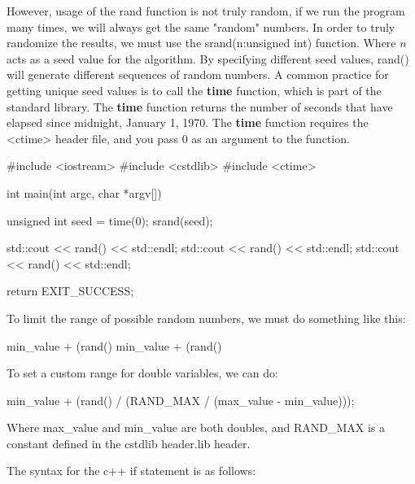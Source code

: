 \documentclass{report}
\begin{document}
    \bigbreak \noindent 
    However, usage of the rand function is not truly random, if we run the program many times, we will always get the same "random" numbers. In order to truly randomize the results, we must use the srand(n:unsigned int) function. Where $n$ acts as a seed value for the algorithm. By specifying different seed values, rand() will generate different sequences of random numbers.
    \bigbreak \noindent 
    A common practice for getting unique seed values is to call the \textbf{time} function, which is part of the standard library. The \textbf{time} function returns the number of seconds that have elapsed since midnight, January 1, 1970. The \textbf{time} function requires the <ctime> header file, and you pass 0 as an argument to the function.
    \smallbreak \noindent
    
    \begin{cppcode}
#include <iostream>
#include <cstdlib>
#include <ctime>

int main(int argc, char *argv[]){

    unsigned int seed = time(0);
    srand(seed);

    std::cout << rand() << std::endl; 
    std::cout << rand() << std::endl; 
    std::cout << rand() << std::endl; 

    return EXIT_SUCCESS;
}
    \end{cppcode}
    
    \bigbreak \noindent 
    To limit the range of possible random numbers, we must do something like this:
    \smallbreak \noindent
    
    \begin{cppcode}
min_value + (rand() %
min_value + (rand() %
    \end{cppcode}
    
    \bigbreak \noindent 
    To set a custom range for double variables, we can do:
    \bigbreak \noindent 
    
    \begin{cppcode}
min_value + (rand() / (RAND_MAX / (max_value - min_value)));
    \end{cppcode}
    
    \bigbreak \noindent 
    Where max\_value and min\_value are both doubles, and RAND\_MAX is a constant defined in the cstdlib header.lib header.

    \pagebreak
    \bigbreak \noindent 
    The syntax for the c++ if statement is as follows:
    \smallbreak \noindent
    
\end{document}
